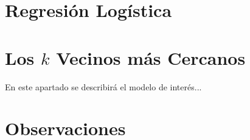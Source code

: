 \documentclass[11pt,letterpaper, reqno]{article}
\begin{document}
\section{Regresión Logística}



\section{Los $k$ Vecinos más Cercanos}
En este apartado se describirá el modelo de interés...

\section{Observaciones}
\end{document}
